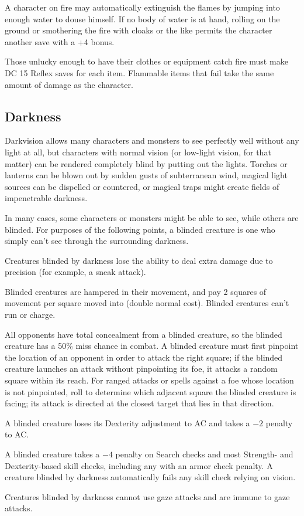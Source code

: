 A character on fire may automatically extinguish the flames by jumping into enough water to douse himself. If no body of water is at hand, rolling on the ground or smothering the fire with cloaks or the like permits the character another save with a +4 bonus.

Those unlucky enough to have their clothes or equipment catch fire must make DC 15 Reflex saves for each item. Flammable items that fail take the same amount of damage as the character.


\subsection{Darkness}
Darkvision allows many characters and monsters to see perfectly well without any light at all, but characters with normal vision (or low-light vision, for that matter) can be rendered completely blind by putting out the lights. Torches or lanterns can be blown out by sudden gusts of subterranean wind, magical light sources can be dispelled or countered, or magical traps might create fields of impenetrable darkness.

In many cases, some characters or monsters might be able to see, while others are blinded. For purposes of the following points, a blinded creature is one who simply can't see through the surrounding darkness.

\begin{itemize*}
\item Creatures blinded by darkness lose the ability to deal extra damage due to precision (for example, a sneak attack).
\item Blinded creatures are hampered in their movement, and pay 2 squares of movement per square moved into (double normal cost). Blinded creatures can't run or charge.
\item All opponents have total concealment from a blinded creature, so the blinded creature has a 50\% miss chance in combat. A blinded creature must first pinpoint the location of an opponent in order to attack the right square; if the blinded creature launches an attack without pinpointing its foe, it attacks a random square within its reach. For ranged attacks or spells against a foe whose location is not pinpointed, roll to determine which adjacent square the blinded creature is facing; its attack is directed at the closest target that lies in that direction.
\item A blinded creature loses its Dexterity adjustment to AC and takes a $-2$ penalty to AC.
\item A blinded creature takes a $-4$ penalty on Search checks and most Strength- and Dexterity-based skill checks, including any with an armor check penalty. A creature blinded by darkness automatically fails any skill check relying on vision.
\item Creatures blinded by darkness cannot use gaze attacks and are immune to gaze attacks.
\end{itemize*}

